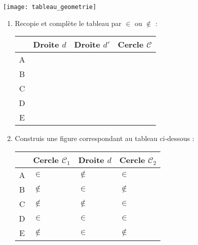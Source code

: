 \begin{exercice}[En géométrie]
\begin{center} \texttt{[image: tableau\_geometrie]} \end{center}
\begin{enumerate}
 \item Recopie et complète le tableau par $\in$ ou $\notin$ : \\[0.3em]
  \begin{center}
 \begin{tabularx}{\linewidth}{|c|X|X|X|}
  \hline
   & \cellcolor{F3} Droite $d$ & \cellcolor{F3} Droite $d'$ & \cellcolor{F3} Cercle $\mathcal{C}$ \\\hline
  \cellcolor{H3} A & & & \\\hline
  \cellcolor{H3} B & & & \\\hline
  \cellcolor{H3} C & & & \\\hline
  \cellcolor{H3} D & & & \\\hline
  \cellcolor{H3} E & & & \\\hline
  \end{tabularx}
\end{center}
\vspace{0.5cm}
 \item Construis une figure correspondant au tableau ci‑dessous : \\[0.3em]
  \begin{center}
 \begin{tabularx}{\linewidth}{|c|X|X|X|}
  \hline
   & \cellcolor{F3} Cercle $\mathcal{C}_1$ & \cellcolor{F3} Droite $d$ & \cellcolor{F3} Cercle $\mathcal{C}_2$ \\\hline
  \cellcolor{H3} A & $\in$ & $\notin$ & $\in$ \\\hline
  \cellcolor{H3} B & $\notin$ & $\in$ & $\notin$ \\\hline
  \cellcolor{H3} C & $\notin$ & $\notin$ & $\in$ \\\hline
  \cellcolor{H3} D & $\in$ & $\in$ & $\in$ \\\hline
  \cellcolor{H3} E & $\notin$ & $\in$ & $\notin$ \\\hline
  \end{tabularx}
\end{center}
 \end{enumerate}
\end{exercice}